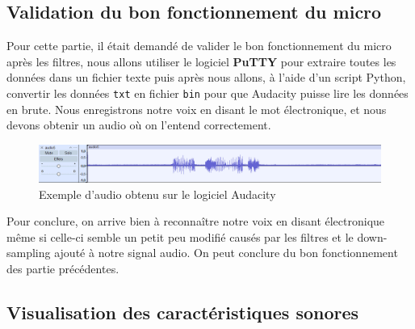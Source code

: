 \documentclass[a4paper,11pt]{article}
\begin{document}
\subsection{Validation du bon fonctionnement du micro}
Pour cette partie, il était demandé de valider le bon fonctionnement du micro après les filtres, nous allons utiliser le logiciel \textbf{PuTTY} pour extraire toutes les données dans un fichier texte puis après nous allons, à l'aide d'un script Python, convertir les données \texttt{txt} en fichier \texttt{bin} pour que Audacity puisse lire les données en brute. Nous enregistrons notre voix en disant le mot électronique, et nous devons obtenir un audio où on l'entend correctement. 
\begin{figure}[H]
\begin{center}
\includegraphics[width=15cm]{images/audacity3.png}
\caption{Exemple d'audio obtenu sur le logiciel Audacity}
\end{center}
\end{figure}
Pour conclure, on arrive bien à reconnaître notre voix en disant électronique même si celle-ci semble un petit peu modifié causés par les filtres et le down-sampling ajouté à notre signal audio. On peut conclure du bon fonctionnement des partie précédentes.

\subsection{Visualisation des caractéristiques sonores}
\end{document}
